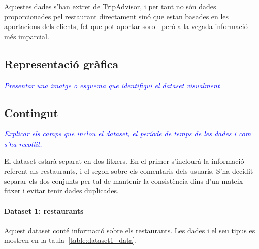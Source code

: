 \documentclass{article}
\newcommand\enunciat[2][blue]{\textcolor{#1}{\emph{#2}}}
\begin{document}
Aquestes dades s'han extret de TripAdvisor, i per tant no són dades
proporcionades pel restaurant directament sinó que estan basades en les
aportacions dels clients, fet que pot aportar soroll però a la vegada
informació més imparcial.


\subsection{Representació gràfica}
\enunciat{Presentar una imatge o esquema que identifiqui el dataset visualment}


\subsection{Contingut}\label{sec:contingut}
\enunciat{Explicar els camps que inclou el dataset, el període de temps de les
dades i com s'ha recollit.}

El dataset estarà separat en dos fitxers. En el primer s'inclourà la informació
referent als restaurants, i el segon sobre els comentaris dels usuaris. S'ha
decidit separar els dos conjunts per tal de mantenir la consistència dins d'un
mateix fitxer i evitar tenir dades duplicades.

\paragraph{Dataset 1: restaurants}
Aquest dataset conté informació sobre els restaurants. Les dades i el seu tipus
es mostren en la taula~\ref{table:dataset1_data}.
\end{document}
